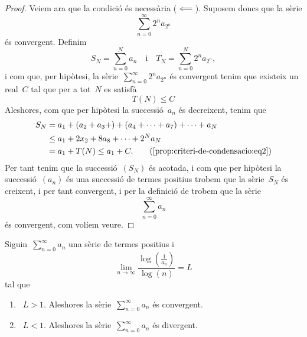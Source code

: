 \documentclass[../../main.tex]{subfiles}
\begin{document}
\begin{proof}
        Veiem ara que la condició és necessària (\(\impliedby\)).
        Suposem doncs que la sèrie
        \[
            \sum_{n=0}^{\infty}2^{n}a_{2^{n}}
        \]
        és convergent.
        Definim
        \[
            S_{N}=\sum_{n=0}^{N}a_{n}\quad\text{i}\quad T_{N}=\sum_{n=0}^{N}2^{n}a_{2^{n}},
        \]
        i com que, per hipòtesi, la sèrie~\(\sum_{n=0}^{\infty}2^{n}a_{2^{n}}\) és convergent tenim que existeix un real~\(C\) tal que per a tot~\(N\) es satisfà
        \begin{equation}
            \label{prop:criteri-de-condensacio:eq2}
            T(N)\leq C
        \end{equation}
        Aleshores, com que per hipòtesi la successió~\(a_{n}\) és decreixent, tenim que
        \begin{align*}
            S_{N}&=a_{1}+(a_{2}+a_{3}+)+(a_{4}+\dots+a_{7})+\dots+a_{N} \\
            &\leq a_{1}+2x_{2}+8a_{8}+\dots+2^{N}a_{N} \\
            &=a_{1}+T(N)\leq a_{1}+C.\tag{\ref{prop:criteri-de-condensacio:eq2}}
        \end{align*}
        Per tant tenim que la successió~\((S_{N})\) és acotada, i com que per hipòtesi la successió~\((a_{n})\) és una successió de termes positius trobem que la sèrie~\(S_{N}\) és creixent, i per tant convergent, %
        i per la definició de  trobem que la sèrie
        \[
            \sum_{n=0}^{\infty}a_{n}
        \]
        és convergent, com volíem veure.
    \end{proof}
    \begin{proposition}
        \label{prop:criteri-logaritmic}
        Siguin~\(\sum_{n=0}^{\infty}a_{n}\) una sèrie de termes positius i
        \[
            \lim_{n\to\infty}\frac{\log\left(\frac{1}{a_{n}}\right)}{\log(n)}=L
        \]
        tal que
        \begin{enumerate}
            \item\label{prop:criteri-logaritmic:enum1}~\(L>1\).
            Aleshores la sèrie~\(\sum_{n=0}^{\infty}a_{n}\) és convergent.
            \item\label{prop:criteri-logaritmic:enum2}~\(L<1\).
            Aleshores la sèrie~\(\sum_{n=0}^{\infty}a_{n}\) és divergent.
        \end{enumerate}
    \end{proposition}
\end{document}
